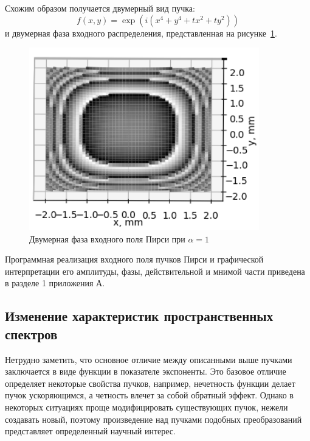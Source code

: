 {{    Схожим образом получается двумерный вид пучка:
    \begin{equation*}
        f(x, y)  = \exp(i(x^4 + y^4 + tx^2 + ty^2))
    \end{equation*}
    и двумерная фаза входного распределения, представленная на рисунке~\ref{pearcey_phase_2d}.
    \begin{figure}[H]
        \begin{center}
            \includegraphics[width=10cm]{plots/pearcey_phase_2d_ortho}
            \caption{Двумерная фаза входного поля Пирси при $\alpha  = 1$}
            \label{pearcey_phase_2d}
        \end{center}
    \end{figure}

    Программная реализация входного поля пучков Пирси и графической
    интерпретации его амплитуды, фазы, действительной и мнимой части
    приведена в разделе 1 приложения А.
    }\label{subsec:численное-моделирование-входного-распределения-пучков-пирси}
    \subsection{Изменение характеристик пространственных спектров}{
    Нетрудно заметить, что основное отличие между описанными выше пучками заключается в виде функции в показателе экспоненты.
    Это базовое отличие определяет некоторые свойства пучков, например, нечетность функции делает пучок ускоряющимся,
    а четность влечет за собой обратный эффект. Однако в некоторых ситуациях проще модифицировать существующих пучок,
    нежели создавать новый, поэтому произведение над пучками подобных преобразований представляет определенный научный интерес.

}}
